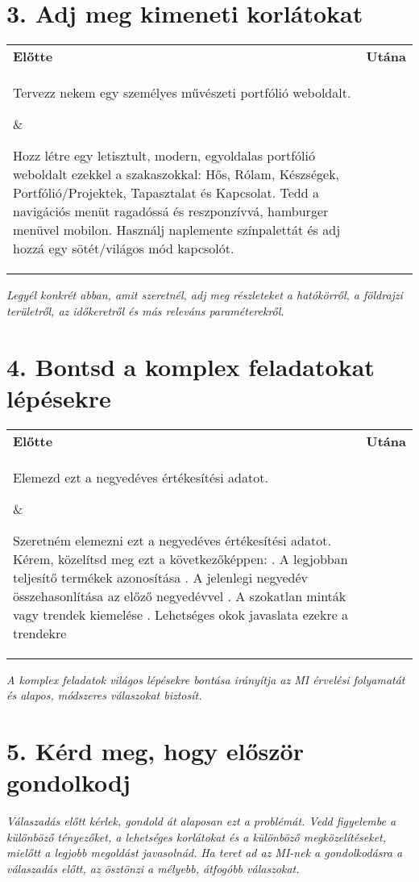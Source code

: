 \documentclass[a4paper, 11pt]{article}
\begin{document}
\section*{3. Adj meg kimeneti korlátokat}
\begin{tabular}{p{} p{}}
\textbf{Előtte} & \textbf{Utána} \\
\parbox[t]{0.45\textwidth}{Tervezz nekem egy személyes művészeti portfólió weboldalt.} & \parbox[t]{0.45\textwidth}{Hozz létre egy letisztult, modern, egyoldalas portfólió weboldalt ezekkel a szakaszokkal: Hős, Rólam, Készségek, Portfólió/Projektek, Tapasztalat és Kapcsolat. Tedd a navigációs menüt ragadóssá és reszponzívvá, hamburger menüvel mobilon. Használj naplemente színpalettát és adj hozzá egy sötét/világos mód kapcsolót.} \\
\end{tabular}
\textit{Legyél konkrét abban, amit szeretnél, adj meg részleteket a hatókörről, a földrajzi területről, az időkeretről és más releváns paraméterekről.}

\section*{4. Bontsd a komplex feladatokat lépésekre}
\begin{tabular}{p{} p{}}
\textbf{Előtte} & \textbf{Utána} \\
\parbox[t]{0.45\textwidth}{Elemezd ezt a negyedéves értékesítési adatot.} & \parbox[t]{0.45\textwidth}{Szeretném elemezni ezt a negyedéves értékesítési adatot. Kérem, közelítsd meg ezt a következőképpen: . A legjobban teljesítő termékek azonosítása . A jelenlegi negyedév összehasonlítása az előző negyedévvel . A szokatlan minták vagy trendek kiemelése . Lehetséges okok javaslata ezekre a trendekre} \\
\end{tabular}
\textit{A komplex feladatok világos lépésekre bontása irányítja az MI érvelési folyamatát és alapos, módszeres válaszokat biztosít.}

\section*{5. Kérd meg, hogy először gondolkodj}
\textit{Válaszadás előtt kérlek, gondold át alaposan ezt a problémát. Vedd figyelembe a különböző tényezőket, a lehetséges korlátokat és a különböző megközelítéseket, mielőtt a legjobb megoldást javasolnád.}
\textit{Ha teret ad az MI-nek a gondolkodásra a válaszadás előtt, az ösztönzi a mélyebb, átfogóbb válaszokat.}
\end{document}
